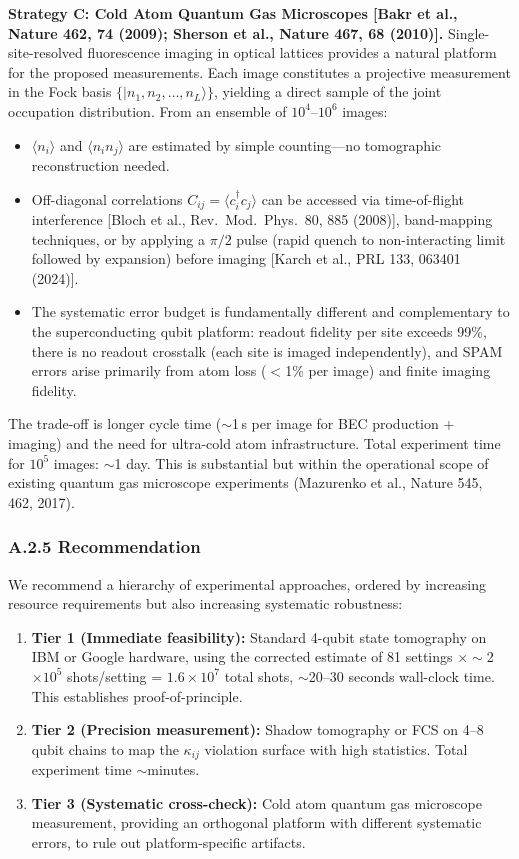 \documentclass[11pt,a4paper]{article}
\begin{document}
\textbf{Strategy C: Cold Atom Quantum Gas Microscopes [Bakr et al., Nature 462, 74 (2009); Sherson et al., Nature 467, 68 (2010)].}
Single-site-resolved fluorescence imaging in optical lattices provides a natural platform for the proposed measurements. Each image constitutes a projective measurement in the Fock basis $\{|n_1, n_2, \dots, n_L\rangle\}$, yielding a direct sample of the joint occupation distribution. From an ensemble of $10^4$--$10^6$ images:
\begin{itemize}[leftmargin=*]
\item $\langle n_i \rangle$ and $\langle n_i n_j \rangle$ are estimated by simple counting---no tomographic reconstruction needed.
\item Off-diagonal correlations $C_{ij} = \langle c^\dagger_i c_j \rangle$ can be accessed via time-of-flight interference [Bloch et al., Rev.\ Mod.\ Phys.\ 80, 885 (2008)], band-mapping techniques, or by applying a $\pi/2$ pulse (rapid quench to non-interacting limit followed by expansion) before imaging [Karch et al., PRL 133, 063401 (2024)].
\item The systematic error budget is fundamentally different and complementary to the superconducting qubit platform: readout fidelity per site exceeds 99\%, there is no readout crosstalk (each site is imaged independently), and SPAM errors arise primarily from atom loss ($<$1\% per image) and finite imaging fidelity.
\end{itemize}
The trade-off is longer cycle time ($\sim$1\,s per image for BEC production + imaging) and the need for ultra-cold atom infrastructure. Total experiment time for $10^5$ images: $\sim$1 day. This is substantial but within the operational scope of existing quantum gas microscope experiments (Mazurenko et al., Nature 545, 462, 2017).

\subsubsection*{A.2.5 Recommendation}

We recommend a hierarchy of experimental approaches, ordered by increasing resource requirements but also increasing systematic robustness:

\begin{enumerate}[leftmargin=*]
\item \textbf{Tier 1 (Immediate feasibility):} Standard 4-qubit state tomography on IBM or Google hardware, using the corrected estimate of 81 settings $\times \sim$2$\times 10^5$ shots/setting = $1.6 \times 10^7$ total shots, $\sim$20--30 seconds wall-clock time. This establishes proof-of-principle.
\item \textbf{Tier 2 (Precision measurement):} Shadow tomography or FCS on 4--8 qubit chains to map the $\kappa_{ij}$ violation surface with high statistics. Total experiment time $\sim$minutes.
\item \textbf{Tier 3 (Systematic cross-check):} Cold atom quantum gas microscope measurement, providing an orthogonal platform with different systematic errors, to rule out platform-specific artifacts.
\end{enumerate}
\end{document}
